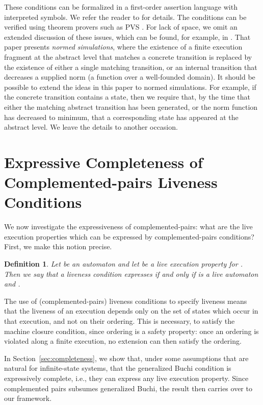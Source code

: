 \documentclass[11pt]{article}
\newcommand{\bd}{\begin{definition}}
\newcommand{\ed}{\end{definition}}
\newcommand{\intrdef}{\emph}	\newcommand{\intr}{\emph}
\newcommand{\empi}[1]{\textit{#1\/}}
\newtheorem{definition}{Definition}
\begin{document}
These conditions can be formalized in a first-order assertion language
with interpreted symbols. We refer the reader to \cite{GL00,GV04} for
details. The conditions can be verified using theorem provers
such as PVS \cite{OSR92}. For lack of space, we omit an extended
discussion of these issues, which can be found, for example, in
\cite{GV04}.
That paper presents \empi{normed simulations}, where the 
existence of a finite execution fragment at the abstract level that
matches a concrete transition is replaced by the existence 
of either a single matching transition, or an internal transition that
decreases a supplied norm (a function over a well-founded domain).
It should be possible to extend the ideas in this paper to normed
simulations. For example, if the concrete transition contains a 
state, then we require that, by the time that either the matching
abstract transition has been generated, or the norm function has
decreased to minimum, that a corresponding  state has appeared
at the abstract level. We leave the details to another occasion.







\section{Expressive Completeness of Complemented-pairs Liveness Conditions}
\label{sec:expressiveness}





We now investigate the expressiveness of complemented-pairs: what 
are the live execution properties which can be expressed by
complemented-pairs conditions? First, we make this notion precise.

\bd
Let  be an automaton and 
let  be a live execution property for . Then we say that
a liveness condition  \intrdef{expresses}  if and only if 
 is a live automaton and .
\ed


The use of (complemented-pairs) liveness conditions to specify
liveness means that the liveness of an execution depends only on the
set of states which occur in that execution, and not on their
ordering. This is necessary, to satisfy the machine closure condition,
since ordering is a safety property: once an ordering is violated
along a finite execution, no extension can then satisfy the ordering.

In Section~\ref{sec:completeness}, we show that, under some
assumptions that are natural for infinite-state systems, that the
generalized Buchi condition is expressively complete, i.e., they can
express any live execution property. Since complemented pairs subsumes
generalized Buchi, the result then carries over to our framework.
\end{document}
